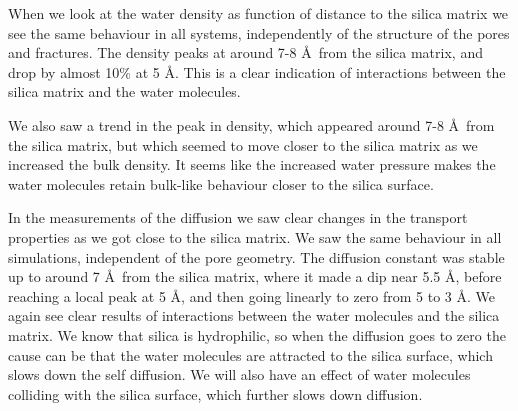 When we look at the water density as function of distance to the silica matrix we see the same behaviour in all systems, independently of the structure of the pores and fractures. The density peaks at around 7-8 \AA\ from the silica matrix, and drop by almost 10\% at 5 \AA. This is a clear indication of interactions between the silica matrix and the water molecules.

We also saw a trend in the peak in density, which appeared around 7-8 \AA\ from the silica matrix, but which seemed to move closer to the silica matrix as we increased the bulk density. It seems like the increased water pressure makes the water molecules retain bulk-like behaviour closer to the silica surface.


In the measurements of the diffusion we saw clear changes in the transport properties as we got close to the silica matrix. We saw the same behaviour in all simulations, independent of the pore geometry. The diffusion constant was stable up to around 7 \AA\ from the silica matrix, where it made a dip near 5.5 \AA, before reaching a local peak at 5 \AA, and then going linearly to zero from 5 to 3 \AA. We again see clear results of interactions between the water molecules and the silica matrix. We know that silica is hydrophilic, so when the diffusion goes to zero the cause can be that the water molecules are attracted to the silica surface, which slows down the self diffusion. We will also have an effect of water molecules colliding with the silica surface, which further slows down diffusion. 

